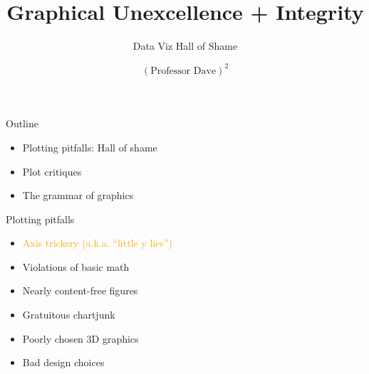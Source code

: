 \documentclass[
  ignorenonframetext,
]{beamer}
\title{Graphical Unexcellence + Integrity}
\subtitle{Data Viz Hall of Shame}
\author{\((\text{Professor Dave})^2\)}
\date{}
\institute{The University of Austin}
\providecommand{\tightlist}{%
  \setlength{\itemsep}{0pt}\setlength{\parskip}{0pt}}
\begin{document}
\frame{\titlepage}

\begin{frame}{Outline}
\label{outline}
\begin{itemize}
\tightlist
\item
  Plotting pitfalls: Hall of shame
\item
  Plot critiques
\item
  The grammar of graphics
\end{itemize}
\end{frame}

\begin{frame}{Plotting pitfalls}
\label{plotting-pitfalls}
\begin{itemize}
\tightlist
\item
  \textcolor{orange}{Axis trickery (a.k.a. “little y lies”)}
\item
  Violations of basic math
\item
  Nearly content-free figures
\item
  Gratuitous chartjunk
\item
  Poorly chosen 3D graphics
\item
  Bad design choices
\end{itemize}
\end{frame}

\begin{frame}{}
\label{section}

\end{frame}
\end{document}
